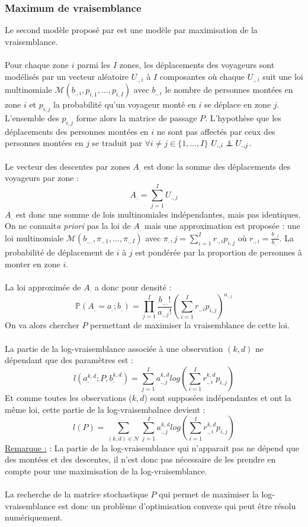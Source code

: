 \documentclass[12pt]{article}
\newcommand{\rmq}{\underline{Remarque :} }
\newcommand\independent{\protect\mathpalette{\protect\independenT}{\perp}}
\def\independenT#1#2{\mathrel{\rlap{$#1#2$}\mkern2mu{#1#2}}}
\begin{document}
\subsubsection{Maximum de vraisemblance}
Le second modèle proposé par \cite{these_remi_coulaud} est une modèle par maximisation de la vraisemblance.\\
\\
Pour chaque zone $i$ parmi les $I$ zones, les déplacements des voyageurs sont modélisés par un vecteur aléatoire $U_{.,i}$ à $I$ composantes où chaque $U_{.,i}$ suit une loi multinomiale $\mathcal{M}(b_{.,i},p_{i,1}, \dots, p_{i,I})$ avec $b_{.,i}$ le nombre de personnes montées en zone $i$ et $p_{i,j}$ la probabilité qu'un voyageur monté en $i$ se déplace en zone $j$. L'ensemble des $p_{i,j}$ forme alors la matrice de passage $P$. L'hypothèse que les déplacements des personnes montées en $i$ ne sont pas affectés par ceux des personnes montées en $j$ se traduit par $\forall i \neq j \in \{1, \dots, I\}$ $U_{.,i} \independent U_{.,j}$.\\
\\
Le vecteur des descentes par zones $A_.$ est donc la somme des déplacements des voyageurs par zone :\[
A_. = \sum_{j=1}^I U_{.,j}
\]
$A_.$ est donc une somme de lois multinomiales indépendantes, mais pas identiques. On ne connait\textit{a priori} pas la loi de $A_.$ mais une approximation est proposée : une loi multinomiale $\mathcal{M}(b_{.,.},\pi_{.,1}, \dots, \pi_{.,I})$ avec $\pi_.,j = \sum_{i=1}^I r_{.,i}p_{i,j}$ où $r_{.,i} = \frac{b_{.,i}}{b_{.,.}}$. La probabilité de déplacement de $i$ à $j$ est pondérée par la proportion de personnes à monter en zone $i$.\\
\\
La loi approximée de $A_.$ a donc pour densité :\[
\mathbb{P}(A_. = a_. ; b_.) = \prod_{j=1}^I \frac{b_{.,.}!}{a_{.,j}!}(\sum^I_{i=1}r_{.,i}p_{i,j})^{a_{.,j}}
\]
On va alors chercher $P$ permettant de maximiser la vraisemblance de cette loi.\\
\\
La partie de la log-vraisemblance associée à une observation $(k,d)$ ne dépendant que des paramètres est :\[
l(a^{k,d}_. ; P, b^{k,d}_.) = \sum_{j=1}^I a_{.,j}^{k,d}log(\sum^I_{i=1}r_{.,i}^{k,d}p_{i,j})
\]
Et comme toutes les observations ($k,d$) sont supposées indépendantes et ont la même loi, cette partie de la log-vraisembalnce devient :\[
l(P) = \sum_{(k,d)\in \mathcal{N}}\sum_{j=1}^I a_{.,j}^{k,d}log(\sum^I_{i=1}r_{.,i}^{k,d}p_{i,j})
\]
\rmq : La partie de la log-vraisemblance qui n'apparait pas ne dépend que des montées et des descentes, il n'est donc pas nécessaire de les prendre en compte pour une maximisation de la log-vraisemblance.\\
\\
La recherche de la matrice stochastique $P$ qui permet de maximiser la log-vraisemblance est donc un problème d'optimisation convexe qui peut être résolu numériquement.
\end{document}
